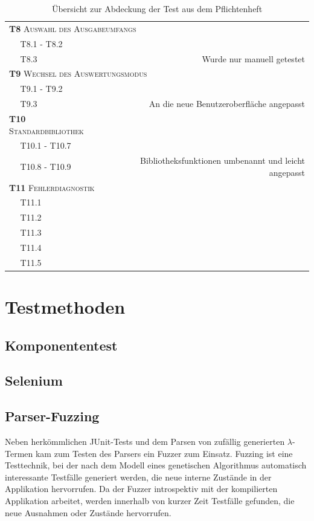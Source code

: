 \documentclass[parskip=full,11pt,openany]{scrreprt}
\newcommand{\cmark}{\ding{51}}%
\newcommand{\xmark}{\ding{55}}%
\begin{document}
\begin{table}[h]
\begin{tabular}{@{}ll|c|r@{}}
		\multicolumn{4}{l}{\small \textsc{\textbf{T8} Auswahl des Ausgabeumfangs}}\\ 
		&T8.1 - T8.2 & \cmark & \\
		&T8.3 & \xmark & Wurde nur manuell getestet \\ %
		\multicolumn{4}{l}{\small \textsc{\textbf{T9} Wechsel des Auswertungsmodus}}\\ 
		&T9.1 - T9.2 & \cmark & \\
		&T9.3 & \cmark & An die neue Benutzeroberfläche angepasst \\
		\multicolumn{3}{l|}{\small \textsc{\textbf{T10} Standardbibliothek}}\\ 
		&T10.1 - T10.7 & \cmark & \\
		&T10.8 - T10.9 & \cmark & Bibliotheksfunktionen umbenannt und leicht angepasst \\
		\multicolumn{3}{l|}{\small \textsc{\textbf{T11} Fehlerdiagnostik}}\\ 
		&T11.1 & \xmark & \\
		&T11.2 & \xmark & \\
		&T11.3 & \xmark & \\
		&T11.4 & \xmark & \\
		&T11.5 & \xmark & \\
		\bottomrule
	\end{tabular}
	\caption{Übersicht zur Abdeckung der Test aus dem Pflichtenheft}
\end{table}


\chapter{Testmethoden}

\section{Komponententest}

\section{Selenium}

\section{Parser-Fuzzing}
Neben herkömmlichen JUnit-Tests und dem Parsen von zufällig generierten
$\lambda$-Termen kam zum Testen des Parsers ein Fuzzer zum Einsatz. Fuzzing ist
eine Testtechnik, bei der nach dem Modell eines genetischen Algorithmus
automatisch interessante Testfälle generiert werden, die neue interne Zustände
in der Applikation hervorrufen. Da der Fuzzer introspektiv mit der kompilierten
Applikation arbeitet, werden innerhalb von kurzer Zeit Testfälle gefunden, die
neue Ausnahmen oder Zustände hervorrufen.
\end{document}
